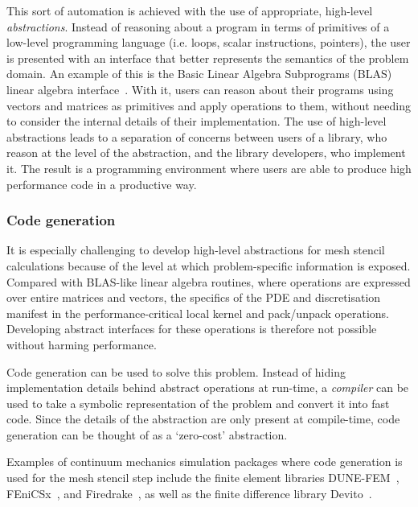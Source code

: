\documentclass[thesis]{subfiles}
\begin{document}
This sort of automation is achieved with the use of appropriate, high-level \emph{abstractions}.
Instead of reasoning about a program in terms of primitives of a low-level programming language (i.e. loops, scalar instructions, pointers), the user is presented with an interface that better represents the semantics of the problem domain.
An example of this is the Basic Linear Algebra Subprograms (BLAS) linear algebra interface~\cite{lawsonBasicLinearAlgebra1979}.
With it, users can reason about their programs using vectors and matrices as primitives and apply operations to them, without needing to consider the internal details of their implementation.
The use of high-level abstractions leads to a separation of concerns between users of a library, who reason at the level of the abstraction, and the library developers, who implement it. 
The result is a programming environment where users are able to produce high performance code in a productive way.

\subsubsection{Code generation}

It is especially challenging to develop high-level abstractions for mesh stencil calculations because of the level at which problem-specific information is exposed.
Compared with BLAS-like linear algebra routines, where operations are expressed over entire matrices and vectors, the specifics of the PDE and discretisation manifest in the performance-critical local kernel and pack/unpack operations.
Developing abstract interfaces for these operations is therefore not possible without harming performance.

Code generation can be used to solve this problem.
Instead of hiding implementation details behind abstract operations at run-time, a \emph{compiler} can be used to take a symbolic representation of the problem and convert it into fast code.
Since the details of the abstraction are only present at compile-time, code generation can be thought of as a `zero-cost' abstraction.

Examples of continuum mechanics simulation packages where code generation is used for the mesh stencil step include the finite element libraries DUNE-FEM~\cite{dednerGenericInterfaceParallel2010}, FEniCSx~\cite{barattaDOLFINxNextGeneration2023}, and Firedrake~\cite{FiredrakeUserManual}, as well as the finite difference library Devito~\cite{devito-api,luporiniArchitecturePerformanceDevito2020}.
\end{document}
